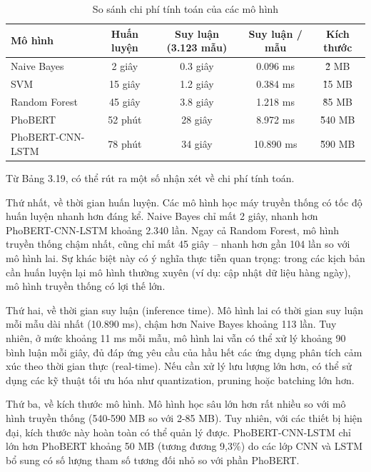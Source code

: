 \documentclass[14pt, a4paper]{report}
\begin{document}
\begin{table}[h]
\centering
\caption{So sánh chi phí tính toán của các mô hình}
\begin{tabular}{|l|c|c|c|c|}
\hline
\textbf{Mô hình} & \textbf{Huấn luyện} & \textbf{Suy luận (3.123 mẫu)} & \textbf{Suy luận / mẫu} & \textbf{Kích thước} \\
\hline
Naive Bayes & 2 giây & 0.3 giây & 0.096 ms & \~2 MB \\
\hline
SVM & 15 giây & 1.2 giây & 0.384 ms & \~15 MB \\
\hline
Random Forest & 45 giây & 3.8 giây & 1.218 ms & \~85 MB \\
\hline
PhoBERT & 52 phút & 28 giây & 8.972 ms & \~540 MB \\
\hline
PhoBERT-CNN-LSTM & 78 phút & 34 giây & 10.890 ms & \~590 MB \\
\hline
\end{tabular}
\end{table}




Từ Bảng 3.19, có thể rút ra một số nhận xét về chi phí tính toán.


Thứ nhất, về thời gian huấn luyện. Các mô hình học máy truyền thống có tốc độ huấn luyện nhanh hơn đáng kể. Naive Bayes chỉ mất 2 giây, nhanh hơn PhoBERT-CNN-LSTM khoảng 2.340 lần. Ngay cả Random Forest, mô hình truyền thống chậm nhất, cũng chỉ mất 45 giây – nhanh hơn gần 104 lần so với mô hình lai. Sự khác biệt này có ý nghĩa thực tiễn quan trọng: trong các kịch bản cần huấn luyện lại mô hình thường xuyên (ví dụ: cập nhật dữ liệu hàng ngày), mô hình truyền thống có lợi thế lớn.


Thứ hai, về thời gian suy luận (inference time). Mô hình lai có thời gian suy luận mỗi mẫu dài nhất (10.890 ms), chậm hơn Naive Bayes khoảng 113 lần. Tuy nhiên, ở mức khoảng 11 ms mỗi mẫu, mô hình lai vẫn có thể xử lý khoảng 90 bình luận mỗi giây, đủ đáp ứng yêu cầu của hầu hết các ứng dụng phân tích cảm xúc theo thời gian thực (real-time). Nếu cần xử lý lưu lượng lớn hơn, có thể sử dụng các kỹ thuật tối ưu hóa như quantization, pruning hoặc batching lớn hơn.


Thứ ba, về kích thước mô hình. Mô hình học sâu lớn hơn rất nhiều so với mô hình truyền thống (540-590 MB so với 2-85 MB). Tuy nhiên, với các thiết bị hiện đại, kích thước này hoàn toàn có thể quản lý được. PhoBERT-CNN-LSTM chỉ lớn hơn PhoBERT khoảng 50 MB (tương đương 9,3\%) do các lớp CNN và LSTM bổ sung có số lượng tham số tương đối nhỏ so với phần PhoBERT.
\end{document}

